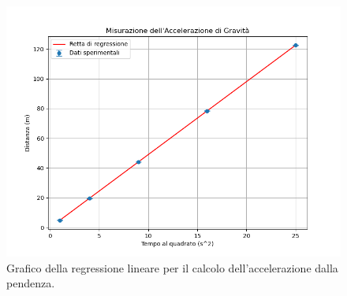 \begin{figure}[!htbp] 
    \centering
\includegraphics[scale=0.6]{g.png} 
    \caption{Grafico della regressione lineare per il calcolo dell'accelerazione dalla pendenza.}
    \label{fig:g}
\end{figure}

